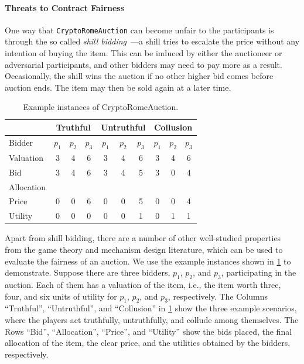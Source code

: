 \paragraph{Threats to Contract Fairness}
One way that \texttt{CryptoRomeAuction} can become unfair to the participants is through the so
called \emph{shill bidding}~\cite{jenamani2007cheating}---a shill tries to escalate the price
without any intention of buying the item.
This can be induced by either the auctioneer or adversarial participants, and other bidders may
need to pay more as a result.
Occasionally, the shill wins the auction if no other higher bid comes before auction ends.
The item may then be sold again at a later time.

\begin{table}[t]
	\caption{Example instances of CryptoRomeAuction.}\label{tab:example}
	\centering\small
	\begin{tabular}{l|ccc|ccc|ccc}
		\toprule
		& \multicolumn{3}{c|}{Truthful} & \multicolumn{3}{c|}{Untruthful} &
		\multicolumn{3}{c}{Collusion} \\
		\midrule
		Bidder & $p_1$ & $p_2$ & $p_3$ & $p_1$ & $p_2$ & $p_3$ & $p_1$ & $p_2$ & $p_3$ \\
		\midrule
		Valuation  & 3 & 4 & 6 & 3 & 4 & 6 & 3 & 4 & 6\\
		Bid  & 3 & 4 & 6 & 3 & 4 & 5 & 3 & 0 & 4 \\
		Allocation  & \xmark & \xmark & \cmark & \xmark & \xmark & \cmark & \xmark & \xmark & \cmark \\
		Price & 0 & 0 & 6 &  0 & 0 & 5 & 0 & 0 & 4 \\
		Utility  & 0 & 0 & 0 & 0 &  0 & 1 & 0 & 1 & 1 \\
		\bottomrule
	\end{tabular}
\end{table}

Apart from shill bidding, there are a number of other well-studied properties from the game theory
and mechanism design literature, which can be used to evaluate the fairness of an auction.
We use the example instances shown in \cref{tab:example} to demonstrate.
Suppose there are three bidders, $p_1$, $p_2$, and $p_3$, participating in the auction.
Each of them has a valuation of the item, i.e., the item worth three, four, and six units of utility for
$p_1$, $p_2$, and $p_3$, respectively.
The Columns ``Truthful'', ``Untruthful'', and ``Collusion'' in \cref{tab:example} show the
three example scenarios, where the players act truthfully, untruthfully, and collude among
themselves.
The Rows ``Bid'', ``Allocation'', ``Price'', and ``Utility'' show the bids placed, the final
allocation of the item, the clear price, and the utilities obtained by the bidders, respectively.

